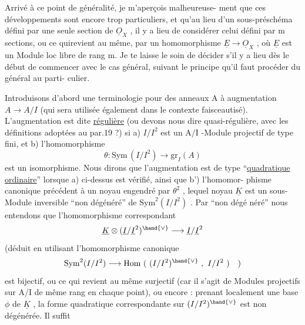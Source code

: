 
Arrivé à ce point  de généralité, je m'aperçois malheureuse-%
ment que ces développements sont encore trop particuliers, et qu'au lieu
d'un sous-préschéma défini par une seule section de $\underline{O}_X$ , il y a lieu de
considérer celui défini par m sections, ou ce qui\hand{/}revient au même, par un
homomorphisme $\underline{E} \longrightarrow \underline{O}_X$ , où $\underline{E}$ est un Module loc libre de rang m. Je te
laisse le soin de décider s'il y a lieu dès le début de commencer avec le
cas général, suivant le principe qu'il faut procéder du général au parti-%
culier.

Introduisons d'abord une terminologie pour des anneaux A à
augmentation $A \to A/I$ (qui sera utilisée également dans le contexte
faisceautisé). L'augmentation est dite \uline{régulière} (ou devons nous dire
quasi-régulière, avec les définitions adoptées au par.19 ?) si a) $I/I^2$ est
un A/I -Module projectif de type fini, et b) l'homomorphisme
\[ \theta\colon \mathrm{Sym}\,(I/I^2) \longrightarrow \mathrm{gr}_I(A) \]
est un isomorphisme. Nous dirons que l'augmentation est de type ``\uline{quadratique}
\uline{ordinaire}'' lorsque a) ci-dessus est vérifié, ainsi que b') l'homomor-%
phisme canonique précédent à un noyau engendré par $\theta^2$ , lequel noyau $\underline{K}$
est un sous-Module inversible ``non dégénéré'' de $\mathrm{Sym}^2(I/I^2)$ . Par ``non dégé%
néré'' nous entendons que l'homomorphisme correspondant
\[ \underline{K} \otimes (\underline{I}/\underline{I}^2)^{\hand{\vee}} \longrightarrow \underline{I}/\underline{I}^2 \]
(déduit en utilisant l'homomorphisme canonique
\[ \mathrm{Sym}^2(I/I^2) \longrightarrow \mathrm{Hom}\ (\ (I/I^2)^{\hand{\vee}}\ ,\ I/I^2\ )\quad ) \]
est bijectif, ou ce qui revient au même surjectif (car il s'agit de
Modules projectifs sur A/I de même rang en chaque point), ou encore : prenant
localement une base $\phi$ de $\underline{K}$ ,  la forme
quadratique correspondante sur $(I/I^2)^{\hand{\vee}}$ est non dégénérée. Il suffit

